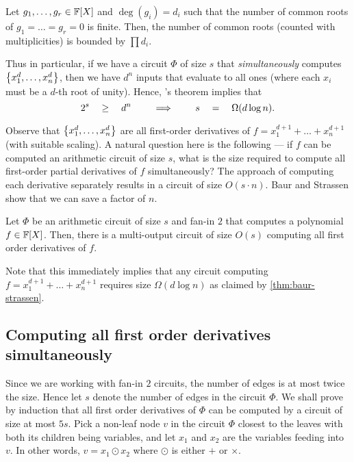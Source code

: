 \begin{theorem}
  Let $g_1,\dots, g_r \in \mathbb{F}[X]$ and $\deg(g_i) = d_i$ such that the number of common roots of $g_1=\dots=g_r = 0$ is finite.
Then, the number of common roots (counted with multiplicities) is bounded by $\prod d_i$.
\end{theorem}

Thus in particular, if we have a circuit $\Phi$ of size $s$ that \emph{simultaneously} computes $\left\{x_1^d, \dots,x_n^d\right\}$, then we have $d^n$ inputs that evaluate to all ones (where each $x_i$ must be  a $d$-th root of unity). 
Hence, \Bezout's theorem implies that
$$
2^s\quad \geq \quad d^n \quad \quad\implies\quad \quad s \quad = \quad \Omega(d\log n).
$$

Observe that $\left\{x_1^d,\dots, x_n^d\right\}$ are all first-order derivatives of $f = x_1^{d+1}+\dots+x_n^{d+1}$ (with suitable scaling). 
A natural question here is the following --- if $f$ can be computed an arithmetic circuit of size $s$, what is the size required to compute all first-order partial derivatives of $f$ simultaneously? 
The \naive approach of computing each derivative separately results in a circuit of size $O(s\cdot n)$. 
Baur and Strassen \cite{BS83} show that we can save a factor of $n$.

\begin{lemma}[\cite{BS83}]\label{lem:baur-strassen}
  Let $\Phi$ be an arithmetic circuit of size $s$ and fan-in $2$ that computes a polynomial $f\in \mathbb{F}[X]$. 
Then, there is a multi-output circuit  of size $O(s)$ computing all first order derivatives of $f$.
\end{lemma}

Note that this immediately implies that any circuit computing $f = x_1^{d+1} + \dots + x_n^{d+1}$ requires size $\Omega(d\log n)$ as claimed by \autoref{thm:baur-strassen}. 


\subsection{Computing all first order derivatives simultaneously}

Since we are working with fan-in $2$ circuits, the number of edges is at most twice the size. 
Hence let $s$ denote the number of edges in the circuit $\Phi$. We shall prove by induction that all first order derivatives of $\Phi$ can be computed by a circuit of size at most $5s$.
Pick a non-leaf node $v$ in the circuit $\Phi$ closest to the leaves with both its children being variables, and let $x_1$ and $x_2$ are the variables feeding into $v$.
In other words, $v = x_1 \odot x_2$ where $\odot$ is either $+$ or $\times$.

